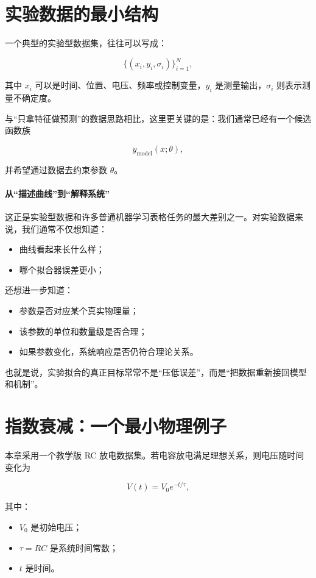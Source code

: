 \section{实验数据的最小结构}

一个典型的实验型数据集，往往可以写成：

\[
\{(x_i, y_i, \sigma_i)\}_{i=1}^N,
\]

其中 $x_i$ 可以是时间、位置、电压、频率或控制变量，$y_i$ 是测量输出，$\sigma_i$ 则表示测量不确定度。

与“只拿特征做预测”的数据思路相比，这里更关键的是：我们通常已经有一个候选函数族

\[
y_{\mathrm{model}}(x;\theta),
\]

并希望通过数据去约束参数 $\theta$。

\paragraph{从“描述曲线”到“解释系统”}

这正是实验型数据和许多普通机器学习表格任务的最大差别之一。对实验数据来说，我们通常不仅想知道：

\begin{itemize}
    \item 曲线看起来长什么样；
    \item 哪个拟合器误差更小；
\end{itemize}

还想进一步知道：

\begin{itemize}
    \item 参数是否对应某个真实物理量；
    \item 该参数的单位和数量级是否合理；
    \item 如果参数变化，系统响应是否仍符合理论关系。
\end{itemize}

也就是说，实验拟合的真正目标常常不是“压低误差”，而是“把数据重新接回模型和机制”。

\section{指数衰减：一个最小物理例子}

本章采用一个教学版 RC 放电数据集。若电容放电满足理想关系，则电压随时间变化为

\[
V(t) = V_0 e^{-t/\tau},
\]

其中：

\begin{itemize}
    \item $V_0$ 是初始电压；
    \item $\tau = RC$ 是系统时间常数；
    \item $t$ 是时间。
\end{itemize}

